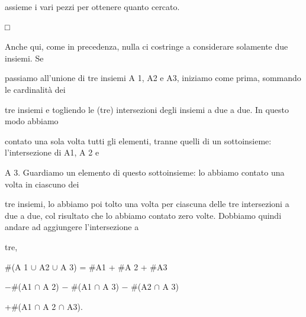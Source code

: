 \documentclass[a4paper,portrait,12pt]{article}
\begin{document}
\begin{flushleft}
assieme i vari pezzi per ottenere quanto cercato.
\end{flushleft}


□


\begin{flushleft}
Anche qui, come in precedenza, nulla ci costringe a considerare solamente due insiemi. Se
\end{flushleft}


\begin{flushleft}
passiamo all'unione di tre insiemi A 1, A2 e A3, iniziamo come prima, sommando le cardinalit\`{a} dei
\end{flushleft}


\begin{flushleft}
tre insiemi e togliendo le (tre) intersezioni degli insiemi a due a due. In questo modo abbiamo
\end{flushleft}


\begin{flushleft}
contato una sola volta tutti gli elementi, tranne quelli di un sottoinsieme: l'intersezione di A1, A 2 e
\end{flushleft}


\begin{flushleft}
A 3. Guardiamo un elemento di questo sottoinsieme: lo abbiamo contato una volta in ciascuno dei
\end{flushleft}


\begin{flushleft}
tre insiemi, lo abbiamo poi tolto una volta per ciascuna delle tre intersezioni a due a due, col risultato che lo abbiamo contato zero volte. Dobbiamo quindi andare ad aggiungere l'intersezione a
\end{flushleft}


\begin{flushleft}
tre,
\end{flushleft}


\begin{flushleft}
\#(A 1 $\cup$ A2 $\cup$ A 3) = \#A1 + \#A 2 + \#A3
\end{flushleft}


\begin{flushleft}
$-$\#(A1 $\cap$ A 2) $-$ \#(A1 $\cap$ A 3) $-$ \#(A2 $\cap$ A 3)
\end{flushleft}


\begin{flushleft}
+\#(A1 $\cap$ A 2 $\cap$ A3).
\end{flushleft}
\end{document}
